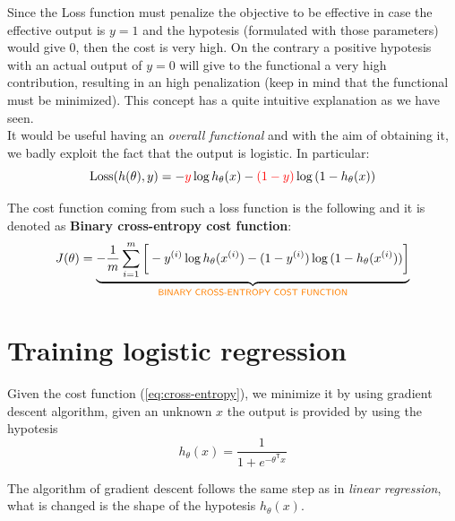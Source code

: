\noindent
Since the Loss function must penalize the objective to be effective in case the effective output is $y=1$ and the hypotesis (formulated with those parameters) would give 0, then the cost is very high. On the contrary a positive hypotesis with an actual output of $y=0$ will give to the functional a very high contribution, resulting in an high penalization (keep in mind that the functional must be minimized). This concept has a quite intuitive explanation as we have seen. \\
It would be useful having an \textit{overall functional} and with the aim of obtaining it, we badly exploit the fact that the output is logistic. In particular: 
\begin{equation}
    \text{Loss}(h(\theta),y)=-{\color{red}y} \log{h_\theta{(x)} - {\color{red}(1-y)}\log{(1-h_\theta(x))}}
\end{equation}

\noindent
The cost function coming from such a loss function is the following and it is denoted as \textbf{Binary cross-entropy cost function}:
\begin{equation} \label{eq:cross-entropy}
    J(\theta)=
    \underbrace{-\frac{1}{m}\sum_{i=1}^m \bigg[
        -{\color{black}y^{(i)}} \log{h_\theta{(x^{(i)})} - {\color{black}(1-y^{(i)})}\log{(1-h_\theta(x^{(i)}))}}
    \bigg]}_{\textsf{\color{orange}BINARY CROSS-ENTROPY COST FUNCTION}}
\end{equation}

\section{Training logistic regression}
Given the cost function (\ref{eq:cross-entropy}), we minimize it by using gradient descent algorithm, given an unknown $x$ the output is provided by using the hypotesis 
\begin{equation}
    h_\theta(x) = \frac{1}{1+e^{-\theta^\textsf{T}{x}}}
\end{equation}

\noindent
The algorithm of gradient descent follows the same step as in \textit{linear regression}, what is changed is the shape of the hypotesis $h_\theta(x)$.

